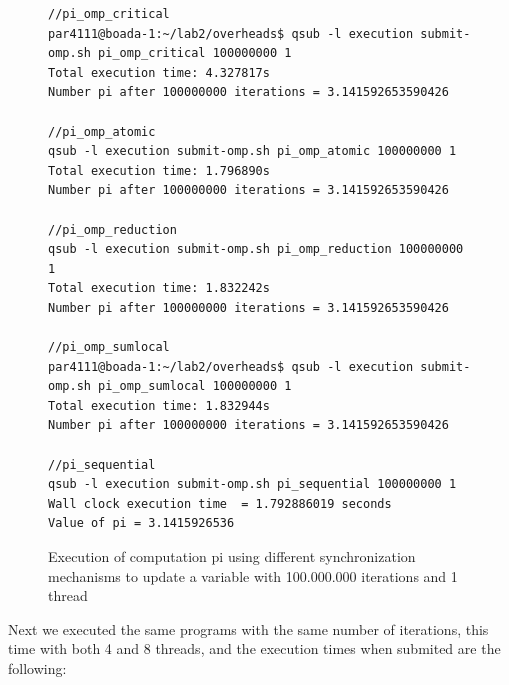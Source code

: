 \documentclass[12]{article}
\begin{document}
\begin{figure}[H]
\begin{lstlisting}[frame=single]
//pi_omp_critical
par4111@boada-1:~/lab2/overheads$ qsub -l execution submit-omp.sh pi_omp_critical 100000000 1
Total execution time: 4.327817s
Number pi after 100000000 iterations = 3.141592653590426

//pi_omp_atomic
qsub -l execution submit-omp.sh pi_omp_atomic 100000000 1
Total execution time: 1.796890s
Number pi after 100000000 iterations = 3.141592653590426

//pi_omp_reduction
qsub -l execution submit-omp.sh pi_omp_reduction 100000000 1
Total execution time: 1.832242s
Number pi after 100000000 iterations = 3.141592653590426

//pi_omp_sumlocal
par4111@boada-1:~/lab2/overheads$ qsub -l execution submit-omp.sh pi_omp_sumlocal 100000000 1
Total execution time: 1.832944s
Number pi after 100000000 iterations = 3.141592653590426

//pi_sequential
qsub -l execution submit-omp.sh pi_sequential 100000000 1
Wall clock execution time  = 1.792886019 seconds
Value of pi = 3.1415926536

\end{lstlisting}
\caption{Execution of computation pi using different synchronization mechanisms to update a variable with 100.000.000 iterations and 1 thread}
\label{overheadsComputation}
\end{figure}


Next we executed the same programs with the same number of iterations, this time with both 4 and 8 threads, and the execution times when submited are the following:
\end{document}
